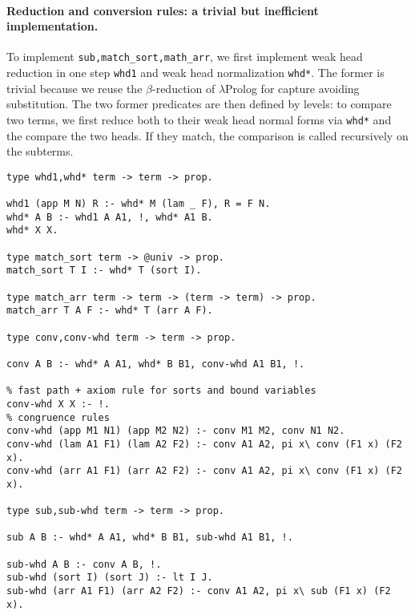 \documentclass{easychair}
\begin{document}
\paragraph{Reduction and conversion rules: a trivial but inefficient implementation. }\label{sec:inefficient}
To implement \verb+sub,match_sort,math_arr+, we first implement weak head
reduction in one step \verb+whd1+ and weak head normalization \verb+whd*+.
The former is trivial because we reuse the $\beta$-reduction of $\lambda$Prolog for capture avoiding substitution. The two former predicates are then defined by levels: to compare two terms, we first reduce both to their weak head normal forms via \verb+whd*+ and the compare the two heads. If they match, the comparison is called recursively on the subterms.

\begin{Verbatim}
type whd1,whd* term -> term -> prop.

whd1 (app M N) R :- whd* M (lam _ F), R = F N.
whd* A B :- whd1 A A1, !, whd* A1 B.
whd* X X.

type match_sort term -> @univ -> prop.
match_sort T I :- whd* T (sort I).

type match_arr term -> term -> (term -> term) -> prop.
match_arr T A F :- whd* T (arr A F).

type conv,conv-whd term -> term -> prop.

conv A B :- whd* A A1, whd* B B1, conv-whd A1 B1, !.

% fast path + axiom rule for sorts and bound variables
conv-whd X X :- !.
% congruence rules
conv-whd (app M1 N1) (app M2 N2) :- conv M1 M2, conv N1 N2.
conv-whd (lam A1 F1) (lam A2 F2) :- conv A1 A2, pi x\ conv (F1 x) (F2 x).
conv-whd (arr A1 F1) (arr A2 F2) :- conv A1 A2, pi x\ conv (F1 x) (F2 x).

type sub,sub-whd term -> term -> prop.

sub A B :- whd* A A1, whd* B B1, sub-whd A1 B1, !.

sub-whd A B :- conv A B, !.
sub-whd (sort I) (sort J) :- lt I J.
sub-whd (arr A1 F1) (arr A2 F2) :- conv A1 A2, pi x\ sub (F1 x) (F2 x).
\end{Verbatim}

\end{document}
